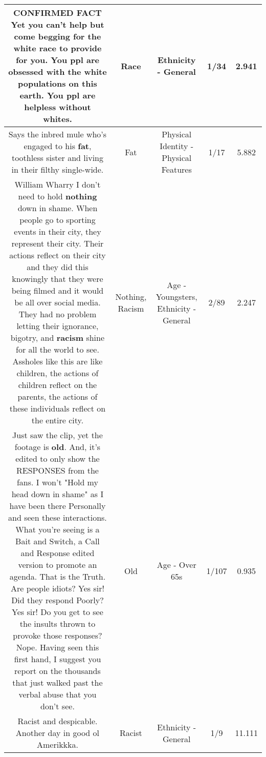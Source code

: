 \documentclass[11pt]{article}
\newlength\mylength
\begin{document}
\begin{center}
\begin{longtable}{|C{.65\mylength}|C{.30\mylength}|C{.12\mylength}|C{.12\mylength}|C{.12\mylength}|}
  \small CONFIRMED FACT Yet you can't help but come begging for the white \textbf{race} to provide for you. You ppl are obsessed with the white populations on this earth. You ppl are helpless without whites.\normalsize   & Race & Ethnicity - General & 1/34 & 2.941 \\  \hline
  \small Says the inbred mule who's engaged to his \textbf{fat}, toothless sister and living in their filthy single-wide.\normalsize   & Fat & Physical Identity - Physical Features & 1/17 & 5.882 \\  \hline
  \small William Wharry I don't need to hold \textbf{nothing} down in shame. When people go to sporting events in their city, they represent their city. Their actions reflect on their city and they did this knowingly that they were being filmed and it would be all over social media. They had no problem letting their ignorance, bigotry, and \textbf{racism} shine for all the world to see. Assholes like this are like children, the actions of children reflect on the parents, the actions of these individuals reflect on the entire city.\normalsize   & Nothing, Racism & Age - Youngsters, Ethnicity - General & 2/89 & 2.247 \\  \hline
  \small Just saw the clip, yet the footage is \textbf{old}. And, it's edited to only show the RESPONSES from the fans. I won't "Hold my head down in shame" as I have been there Personally and seen these interactions. What you're seeing is a Bait and Switch, a Call and Response edited version to promote an agenda. That is the Truth. Are people idiots? Yes sir! Did they respond Poorly? Yes sir! Do you get to see the insults thrown to provoke those responses? Nope. Having seen this first hand, I suggest you report on the thousands that just walked past the verbal abuse that you don't see.\normalsize   & Old & Age - Over 65s & 1/107 & 0.935 \\  \hline
  \small Racist and despicable. Another day in good ol Amerikkka.\normalsize   & Racist & Ethnicity - General & 1/9 & 11.111 \\  \hline

\end{longtable}
\end{center}
\end{document}
